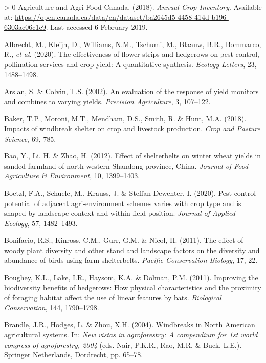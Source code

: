 \documentclass[]{elsarticle} %
\newlength{\cslhangindent}
\newenvironment{CSLReferences}[3] %
 {%
  \setlength{\parindent}{0pt}
  \ifodd #1 \everypar{\setlength{\hangindent}{\cslhangindent}}\ignorespaces\fi
  \ifnum #2 > 0
  \setlength{\parskip}{#2\baselineskip}
  \fi
 }%
 {}
\begin{document}
\hypertarget{refs}{}
\begin{CSLReferences}{1}{0}
\leavevmode\hypertarget{ref-AAFC_data}{}%
Agriculture and Agri-Food Canada. (2018). \emph{{Annual Crop Inventory}}. Available at: \url{https://open.canada.ca/data/en/dataset/ba2645d5-4458-414d-b196-6303ac06c1c9}. Last accessed 6 February 2019.

\leavevmode\hypertarget{ref-albrecht2020}{}%
Albrecht, M., Kleijn, D., Williams, N.M., Tschumi, M., Blaauw, B.R., Bommarco, R., \emph{et al.} (2020). The effectiveness of flower strips and hedgerows on pest control, pollination services and crop yield: A quantitative synthesis. \emph{Ecology Letters}, 23, 1488--1498.

\leavevmode\hypertarget{ref-arslan2002}{}%
Arslan, S. \& Colvin, T.S. (2002). An evaluation of the response of yield monitors and combines to varying yields. \emph{Precision Agriculture}, 3, 107--122.

\leavevmode\hypertarget{ref-baker2018}{}%
Baker, T.P., Moroni, M.T., Mendham, D.S., Smith, R. \& Hunt, M.A. (2018). Impacts of windbreak shelter on crop and livestock production. \emph{Crop and Pasture Science}, 69, 785.

\leavevmode\hypertarget{ref-bao2012}{}%
Bao, Y., Li, H. \& Zhao, H. (2012). Effect of shelterbelts on winter wheat yields in sanded farmland of north-western {Shandong} province, {China}. \emph{Journal of Food Agriculture \& Environment}, 10, 1399--1403.

\leavevmode\hypertarget{ref-boetzl2020}{}%
Boetzl, F.A., Schuele, M., Krauss, J. \& Steffan-Dewenter, I. (2020). Pest control potential of adjacent agri-environment schemes varies with crop type and is shaped by landscape context and within-field position. \emph{Journal of Applied Ecology}, 57, 1482--1493.

\leavevmode\hypertarget{ref-bonifacio2011}{}%
Bonifacio, R.S., Kinross, C.M., Gurr, G.M. \& Nicol, H. (2011). The effect of woody plant diversity and other stand and landscape factors on the diversity and abundance of birds using farm shelterbelts. \emph{Pacific Conservation Biology}, 17, 22.

\leavevmode\hypertarget{ref-boughey2011}{}%
Boughey, K.L., Lake, I.R., Haysom, K.A. \& Dolman, P.M. (2011). Improving the biodiversity benefits of hedgerows: How physical characteristics and the proximity of foraging habitat affect the use of linear features by bats. \emph{Biological Conservation}, 144, 1790--1798.

\leavevmode\hypertarget{ref-brandle2004}{}%
Brandle, J.R., Hodges, L. \& Zhou, X.H. (2004). Windbreaks in {North American} agricultural systems. In: \emph{New vistas in agroforestry: A compendium for 1st world congress of agroforestry, 2004} (eds. Nair, P.K.R., Rao, M.R. \& Buck, L.E.). Springer Netherlands, Dordrecht, pp. 65--78.


\end{CSLReferences}
\end{document}

